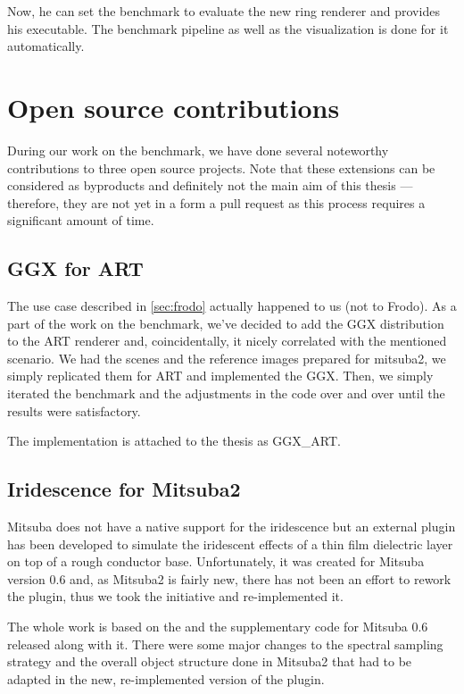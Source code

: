 Now, he can set the benchmark to evaluate the new ring renderer and provides his executable. The benchmark pipeline as well as the visualization is done for it automatically.

\section{Open source contributions}

During our work on the benchmark, we have done several noteworthy contributions to three open source projects. Note that these extensions can be considered as byproducts and definitely not the main aim of this thesis --- therefore, they are not yet in a form a pull request as this process requires a significant amount of time.

\subsection{GGX for ART}

The use case described in \autoref{sec:frodo} actually happened to us (not to Frodo). As a part of the work on the benchmark, we've decided to add the GGX distribution to the ART renderer and, coincidentally, it nicely correlated with the mentioned scenario. We had the scenes and the reference images prepared for mitsuba2, we simply replicated them for ART and implemented the GGX. Then, we simply iterated the benchmark and the adjustments in the code over and over until the results were satisfactory.

The implementation is attached to the thesis as GGX\_ART.

\subsection{Iridescence for Mitsuba2}

Mitsuba does not have a native support for the iridescence but an external plugin has been developed to simulate the iridescent effects of a thin film dielectric layer on top of a rough conductor base. Unfortunately, it was created for Mitsuba version 0.6 and, as Mitsuba2 is fairly new, there has not been an effort to rework the plugin, thus we took the initiative and re-implemented it.

The whole work is based on the \citet{belcour2017practical} and the supplementary code for Mitsuba 0.6 released along with it.
There were some major changes to the spectral sampling strategy and the overall object structure done in Mitsuba2 that had to be adapted in the new, re-implemented version of the plugin.

